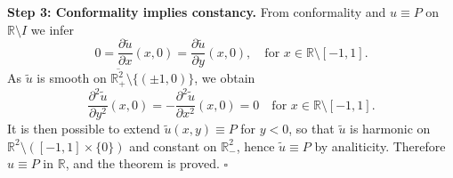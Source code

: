 \documentclass[12pt, a4paper]{article}
\newcommand{\de}{\partial}
\newcommand{\R}{\mathbb{R}}
\newcommand{\blu}[1]{{\color{blue}#1}}
\newcommand{\red}[1]{{\color{red}#1}}
\renewcommand{\(}{\left(}
\renewcommand{\)}{\right)}
\begin{document}
\noindent\textbf{Step 3: Conformality implies constancy.} From conformality and $u\equiv P$ on $\R\setminus I$ we infer
\begin{equation}\label{tildeuconf}
0=\frac{\de \tilde u}{\de x}(x,0)=\frac{\de \tilde u}{\de y}(x,0),\quad \text{for }x\in \R\setminus [-1,1].
\end{equation} As $\tilde u$ is smooth on $\overline{\R^2_+}\setminus \{(\pm1,0)\}$,  we obtain 
$$\frac{\de^2 \tilde u}{\de y^2}(x,0)=-\frac{\de^2 \tilde u}{\de x^2}(x,0) =0\quad \text{for }x\in \R\setminus [-1,1].$$
It is then possible to extend $\tilde u(x,y)\equiv P$ for $y<0$, so that $\tilde u$ is harmonic on $\R^2\setminus([-1,1]\times \{0\})$ and constant on $\R^2_-$, hence $\tilde u\equiv P$ by analiticity. Therefore $u\equiv P$ in $\R$, and the theorem is proved. \hfill$\square$


 
\end{document}
